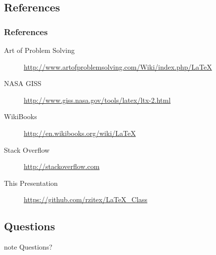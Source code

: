 \subsection{References}
\begin{frame}
\frametitle{References}
\begin{description}
    \item[Art of Problem Solving] \url{http://www.artofproblemsolving.com/Wiki/index.php/LaTeX}
    \item[NASA GISS] \url{http://www.giss.nasa.gov/tools/latex/ltx-2.html}
    \item[WikiBooks] \url{http://en.wikibooks.org/wiki/LaTeX}
    \item[Stack Overflow] \url{http://stackoverflow.com}
    \item[This Presentation] \url{https://github.com/rzitex/LaTeX\_Class}
\end{description}
\end{frame}

\subsection{Questions}
\begin{frame}
\begin{beamercolorbox}[center,shadow=true,rounded=true,]{note}
        Questions?
\end{beamercolorbox}
\end{frame} 
